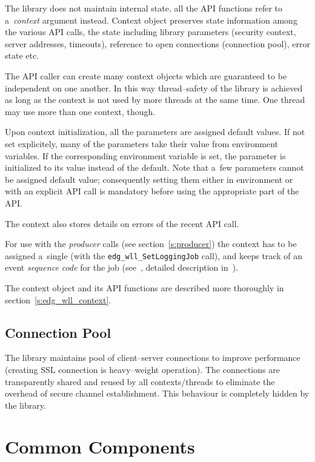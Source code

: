 The \LB library does not maintain internal state, all the API
functions refer to a~\emph{context} argument instead.
Context object preserves state information among the various API
calls, the state including \LB library parameters (\eg security
context, server addresses, timeouts), reference to open connections
(connection pool), error state etc.

The API caller can create many context objects which are guaranteed
to be independent on one another. In this way thread--safety of the
library is achieved as long as the context is not used by more threads
at the same time. One thread may use more than one context, though.

Upon context initialization, all the parameters are assigned default
values. If not set explicitely, many of the parameters take their
value from environment variables. If the corresponding environment
variable is set, the parameter is initialized to its value instead of
the default. Note that a~few parameters cannot be assigned default
value; consequently setting them either in environment or with an
explicit API call is mandatory before using the appropriate part of
the API.

The context also stores details on errors of the recent API call.

For use with the \emph{producer} calls (see section~\ref{s:producer})
the context has to be assigned a~single \jobid (with the
\lstinline'edg_wll_SetLoggingJob' call), and keeps track of an event
\emph{sequence code} for the job (see~\cite{lbug}, detailed
description in~\cite{lbarch}).

The context object and its API functions are described more thoroughly
in section~\ref{s:edg_wll_context}.

\subsection{Connection Pool}
The \LB library maintains pool of client--server connections to
improve performance (creating SSL connection is heavy--weight
operation). The connections are transparently shared and reused by all
contexts/threads to eliminate the overhead of secure channel
establishment. This behaviour is completely hidden by the library.

\section{\LB Common Components}
\label{s:common}

